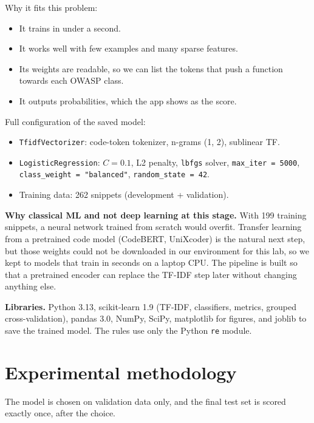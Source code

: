 \documentclass[11pt,a4paper]{article}
\newcommand{\code}[1]{\texttt{#1}}
\begin{document}
Why it fits this problem:
\begin{itemize}
  \item It trains in under a second.
  \item It works well with few examples and many sparse features.
  \item Its weights are readable, so we can list the tokens that push a function towards
        each OWASP class.
  \item It outputs probabilities, which the app shows as the score.
\end{itemize}

Full configuration of the saved model:
\begin{itemize}
  \item \code{TfidfVectorizer}: code-token tokenizer, n-grams (1, 2), sublinear TF.
  \item \code{LogisticRegression}: $C = 0.1$, L2 penalty, \code{lbfgs} solver,
        \code{max\_iter = 5000}, \code{class\_weight = "balanced"},
        \code{random\_state = 42}.
  \item Training data: 262 snippets (development + validation).
\end{itemize}

\textbf{Why classical ML and not deep learning at this stage.} With 199 training
snippets, a neural network trained from scratch would overfit. Transfer learning from a
pretrained code model (CodeBERT, UniXcoder) is the natural next step, but those weights
could not be downloaded in our environment for this lab, so we kept to models that train
in seconds on a laptop CPU. The pipeline is built so that a pretrained encoder can replace
the TF-IDF step later without changing anything else.

\textbf{Libraries.} Python 3.13, scikit-learn 1.9 (TF-IDF, classifiers, metrics, grouped
cross-validation), pandas 3.0, NumPy, SciPy, matplotlib for figures, and joblib to save
the trained model. The rules use only the Python \code{re} module.

\section{Experimental methodology}
\label{sec:method}

The model is chosen on validation data only, and the final test set is scored exactly
once, after the choice.
\end{document}
